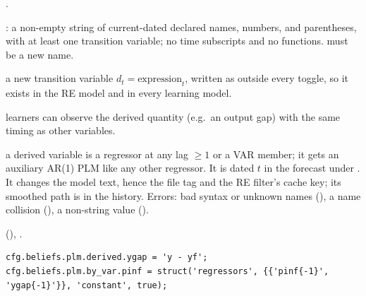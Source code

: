 \documentclass[11pt,a4paper]{article}
\DeclareRobustCommand{\codem}[1]{\texttt{\detokenize{#1}}}
\newenvironment{optspec}%
  {\begin{description}[style=sameline,leftmargin=2.7cm,labelwidth=2.5cm,font=\normalfont\itshape]}%
  {\end{description}}
\begin{document}
\subsubsection{\texorpdfstring{\codem{beliefs.plm.derived}}{beliefs.plm.derived}}\label{opt:beliefs-plm-derived}
\begin{optspec}
  \item[Default] .
  \item[Values] : a non-empty string of current-dated
        declared names, numbers, \code{+ - * /} and parentheses, with at least one transition
        variable; no time subscripts and no functions.  must be a new name.
  \item[Math] a new transition variable $d_t = \text{expression}_t$, written as
         outside every toggle, so it exists in the RE model and in
        every learning model.
  \item[Assumptions] learners can observe the derived quantity (e.g.\ an output gap) with the
        same timing as other variables.
  \item[Interactions] a derived variable is a regressor at any lag $\ge 1$ or a VAR member;
        it gets an auxiliary AR(1) PLM like any other regressor. It is dated $t$ in the
        forecast under . It changes the model text, hence the
        file tag and the RE filter's cache key; its smoothed path is in the history. Errors:
        bad syntax or unknown names (), a name collision
        (), a non-string value
        ().
  \item[Code]  (), .
  \item[Example]
\begin{lstlisting}
cfg.beliefs.plm.derived.ygap = 'y - yf';
cfg.beliefs.plm.by_var.pinf = struct('regressors', {{'pinf{-1}', 'ygap{-1}'}}, 'constant', true);
\end{lstlisting}
\end{optspec}
\end{document}
